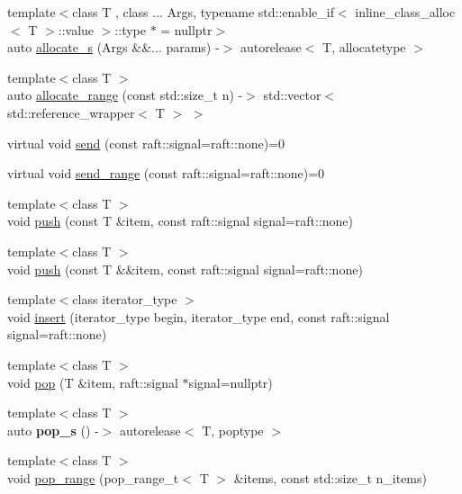 \begin{DoxyCompactItemize}
\item 
{\footnotesize template$<$class T , class ... Args, typename std\+::enable\+\_\+if$<$ inline\+\_\+class\+\_\+alloc$<$ T $>$\+::value $>$\+::type $\ast$  = nullptr$>$ }\\auto \hyperlink{class_f_i_f_o_aa5f5334a93f8a014eb19d488898a2e39}{allocate\+\_\+s} (Args \&\&... params) -\/$>$ autorelease$<$ T, allocatetype $>$
\item 
{\footnotesize template$<$class T $>$ }\\auto \hyperlink{class_f_i_f_o_a8b93da58a3fd6ecd844827c4fcbd2473}{allocate\+\_\+range} (const std\+::size\+\_\+t n) -\/$>$ std\+::vector$<$ std\+::reference\+\_\+wrapper$<$ T $>$ $>$
\item 
virtual void \hyperlink{class_f_i_f_o_a0bb564ddace3951ed7754a285b438ba4}{send} (const raft\+::signal=raft\+::none)=0
\item 
virtual void \hyperlink{class_f_i_f_o_ac0be4de6db251e1a2e6dcc97a5d4a584}{send\+\_\+range} (const raft\+::signal=raft\+::none)=0
\item 
{\footnotesize template$<$class T $>$ }\\void \hyperlink{class_f_i_f_o_a381974271d6c818473edd23c355f0d36}{push} (const T \&item, const raft\+::signal signal=raft\+::none)
\item 
{\footnotesize template$<$class T $>$ }\\void \hyperlink{class_f_i_f_o_ad1237dfa071d0ca2002bd5aa0ce6d203}{push} (const T \&\&item, const raft\+::signal signal=raft\+::none)
\item 
{\footnotesize template$<$class iterator\+\_\+type $>$ }\\void \hyperlink{class_f_i_f_o_a922b94b854cc9e3ee37fbd447982f663}{insert} (iterator\+\_\+type begin, iterator\+\_\+type end, const raft\+::signal signal=raft\+::none)
\item 
{\footnotesize template$<$class T $>$ }\\void \hyperlink{class_f_i_f_o_a0607b6c931ed1fab618e637af617dd15}{pop} (T \&item, raft\+::signal $\ast$signal=nullptr)
\item 
\hypertarget{class_f_i_f_o_ad0ae6389ad4f59a38eb859f1b7d5db1f}{}\label{class_f_i_f_o_ad0ae6389ad4f59a38eb859f1b7d5db1f} 
{\footnotesize template$<$class T $>$ }\\auto {\bfseries pop\+\_\+s} () -\/$>$ autorelease$<$ T, poptype $>$
\item 
{\footnotesize template$<$class T $>$ }\\void \hyperlink{class_f_i_f_o_a23be63e817ff487d32013064e752f02f}{pop\+\_\+range} (pop\+\_\+range\+\_\+t$<$ T $>$ \&items, const std\+::size\+\_\+t n\+\_\+items)

\end{DoxyCompactItemize}
